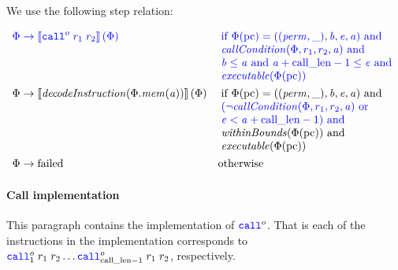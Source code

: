 \documentclass[a3paper]{article}
\newcommand{\sem}[1]{\left\llbracket #1 \right\rrbracket}
\newcommand{\tand}{\text{ and }}
\newcommand{\tor}{\text{ or }}
\newcommand{\totherwise}{\text{otherwise }}
\newcommand{\sourcecolor}{\color{blue}}
\newcommand{\src}[1]{{\sourcecolor #1}}
\newcommand{\zinstr}[1]{\texttt{#1}}
\newcommand{\scall}[4][]{  
\ifthenelse{\equal{#3#4}{}}
  {\ensuremath{\zinstr{\src{call}}_{#1}^{#2}}}
  {\ensuremath{\zinstr{\src{call}}_{#1}^{#2} \; #3 \; #4}}
}
\newcommand{\perm}{\var{perm}}
\newcommand{\failed}{\mathrm{failed}}
\newcommand{\step}{\rightarrow}
\newcommand{\var}[1]{\mathit{#1}}
\newcommand{\mem}{\var{mem}}
\newcommand{\baddr}{\var{b}}
\newcommand{\eaddr}{\var{e}}
\newcommand{\aaddr}{\var{a}}
\newcommand{\constant}[1]{\mathrm{#1}}
\newcommand{\calllen}{\constant{call\_len}}
\newcommand{\pcreg}{\mathrm{pc}}
\newcommand{\plainfun}[2]{
  \ifthenelse{\equal{#2}{}}
  {\mathit{#1}}
  {\mathit{#1}(#2)}
}
\newcommand{\callCond}[1]{\plainfun{callCondition}{#1}}
\newcommand{\decInstr}[1]{\plainfun{decodeInstruction}{#1}}
\newcommand{\exec}[1]{\plainfun{executable}{#1}}
\newcommand{\withinBounds}[1]{\plainfun{withinBounds}{#1}}
\begin{document}
We use the following step relation:

\begin{align*}
  \src{\Phi} & \; \src{\step \sem{\scall{o}{r_1}{r_2}}(\Phi)} &  &\sourcecolor\left.\arraycolsep=0pt
                                                  \begin{array}[t]{l}
                                                    \text{if }\Phi(\pcreg) = ((\perm,\_),\baddr,\eaddr,\aaddr) \tand \\
                                                    \callCond{\Phi,r_1,r_2,\aaddr} \tand\\
                                                    \baddr \leq \aaddr \tand \aaddr + \calllen-1 \leq \eaddr \tand \\
                                                    \exec{\Phi(\pcreg)}
                                                  \end{array}\right.\\
  \Phi & \step \sem{\decInstr{\Phi.\mem(\aaddr)}}(\Phi) & &\left.\arraycolsep=0pt
                                                  \begin{array}[t]{l}
                                                    \text{if }\Phi(\pcreg) = ((\perm,\_),\baddr,\eaddr,\aaddr) \tand \\
                                                    \src{(\neg\callCond{\Phi,r_1,r_2,\aaddr} \tor}\\
                                                    \src{\eaddr < \aaddr + \calllen-1) \tand} \\
                                                    \withinBounds{\Phi(\pcreg)} \tand \\
                                                    \exec{\Phi(\pcreg)}
                                                  \end{array}\right.\\
  \Phi& \step \failed & & \totherwise
\end{align*}

\paragraph{Call implementation}
\label{par:call-impl}
This paragraph contains the implementation of $\scall{o}{}{}$. That is each of the instructions in the implementation corresponds to $\scall[1]{o}{r_1}{r_2} \dots \scall[\calllen-1]{o}{r_1}{r_2}$, respectively.
\end{document}
